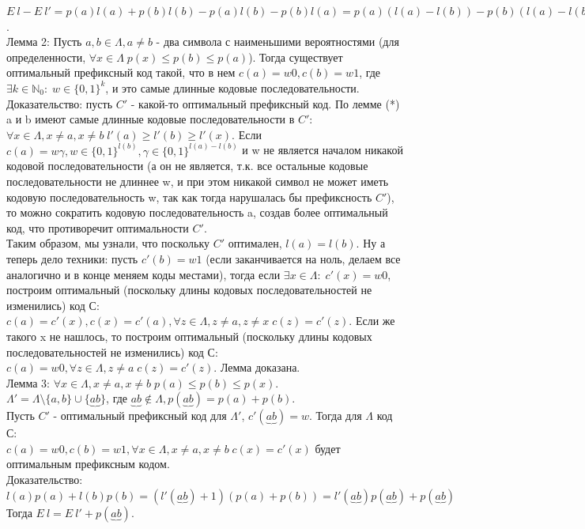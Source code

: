 $E \: l - E \: l' = p(a)l(a) + p(b)l(b) - p(a)l(b) - p(b)l(a) = p(a)(l(a) - l(b)) - p(b)(l(a) - l(b)) = (p(a) - p(b))(l(a) - l(b)) > 0$.\\
Лемма 2: Пусть $a, b \in \Lambda, a \not= b$ - два символа с наименьшими вероятностями (для определенности, $\forall x \in \Lambda \; p(x) \leq p(b) \leq p(a)$). Тогда существует оптимальный префиксный код такой, что в нем $c(a) = w0, c(b) = w1$, где $\exists k \in \mathbb{N}_0: \; w \in \{0, 1\}^k$, и это самые длинные кодовые последовательности.\\
Доказательство: пусть $C'$ - какой-то оптимальный префиксный код. По лемме (*) a и b имеют самые длинные кодовые последовательности в $C'$: $\forall x \in \Lambda, x \not= a, x \not= b \; l'(a) \geq l'(b) \geq l'(x)$. Если $c(a) = w\gamma, w \in \{0, 1\}^{l(b)}, \gamma \in \{0, 1\}^{l(a) - l(b)}$ и w не является началом никакой кодовой последовательности (а он не является, т.к. все остальные кодовые последовательности не длиннее w, и при этом никакой символ не может иметь кодовую последовательность w, так как тогда нарушалась бы префиксность $C'$), то можно сократить кодовую последовательность a, создав более оптимальный код, что противоречит оптимальности $C'$.\\
Таким образом, мы узнали, что поскольку $C'$ оптимален, $l(a) = l(b)$. Ну а теперь дело техники: пусть $c'(b) = w1$ (если заканчивается на ноль, делаем все аналогично и в конце меняем коды местами), тогда если $\exists x \in \Lambda: \; c'(x) = w0$, построим оптимальный (поскольку длины кодовых последовательностей не изменились) код С: $c(a) = c'(x), c(x) = c'(a), \forall z \in \Lambda, z \not= a, z \not= x \; c(z) = c'(z)$. Если же такого x не нашлось, то построим оптимальный (поскольку длины кодовых последовательностей не изменились) код С: $c(a) = w0, \forall z \in \Lambda, z \not= a \; c(z) = c'(z)$. Лемма доказана.\\
Лемма 3: $\forall x \in \Lambda, x \not= a, x \not= b \; p(a) \leq p(b) \leq p(x)$.\\
$\Lambda' = \Lambda \setminus \{a, b\} \cup \{\underbrace{ab}\}$, где $\underbrace{ab} \not\in \Lambda, p(\underbrace{ab}) = p(a) + p(b)$.\\
Пусть $C'$ - оптимальный префиксный код для $\Lambda'$, $c'(\underbrace{ab}) = w$. Тогда для $\Lambda$ код С:\\
$c(a) = w0, c(b) = w1, \forall x \in \Lambda, x \not= a, x \not= b \; c(x) = c'(x)$ будет оптимальным префиксным кодом.\\
Доказательство: $l(a)p(a) + l(b)p(b) = (l'(\underbrace{ab}) + 1)(p(a) + p(b)) = l'(\underbrace{ab})p(\underbrace{ab}) + p(\underbrace{ab})$ Тогда $E \: l = E \: l' + p(\underbrace{ab})$.\\
